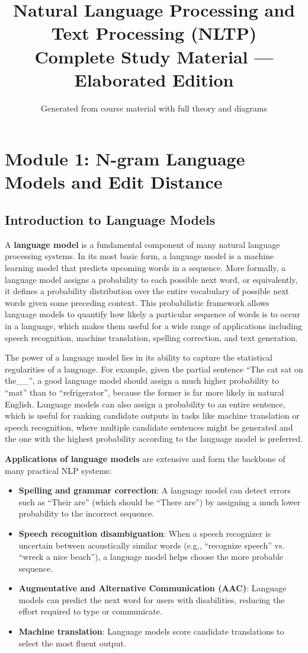 \documentclass[11pt,a4paper]{article}
\title{\textbf{Natural Language Processing and Text Processing (NLTP)\\Complete Study Material — Elaborated Edition}}
\author{Generated from course material with full theory and diagrams}
\date{}
\begin{document}
\maketitle
\tableofcontents
\newpage

\section{Module 1: N-gram Language Models and Edit Distance}

\subsection{Introduction to Language Models}

A \textbf{language model} is a fundamental component of many natural language processing systems. In its most basic form, a language model is a machine learning model that predicts upcoming words in a sequence. More formally, a language model assigns a probability to each possible next word, or equivalently, it defines a probability distribution over the entire vocabulary of possible next words given some preceding context. This probabilistic framework allows language models to quantify how likely a particular sequence of words is to occur in a language, which makes them useful for a wide range of applications including speech recognition, machine translation, spelling correction, and text generation.

The power of a language model lies in its ability to capture the statistical regularities of a language. For example, given the partial sentence ``The cat sat on the\_\_'', a good language model should assign a much higher probability to ``mat'' than to ``refrigerator'', because the former is far more likely in natural English. Language models can also assign a probability to an entire sentence, which is useful for ranking candidate outputs in tasks like machine translation or speech recognition, where multiple candidate sentences might be generated and the one with the highest probability according to the language model is preferred.

\textbf{Applications of language models} are extensive and form the backbone of many practical NLP systems:
\begin{itemize}
    \item \textbf{Spelling and grammar correction}: A language model can detect errors such as ``Their are'' (which should be ``There are'') by assigning a much lower probability to the incorrect sequence.
    \item \textbf{Speech recognition disambiguation}: When a speech recognizer is uncertain between acoustically similar words (e.g., ``recognize speech'' vs. ``wreck a nice beach''), a language model helps choose the more probable sequence.
    \item \textbf{Augmentative and Alternative Communication (AAC)}: Language models can predict the next word for users with disabilities, reducing the effort required to type or communicate.
    \item \textbf{Machine translation}: Language models score candidate translations to select the most fluent output.
\end{itemize}
\end{document}
